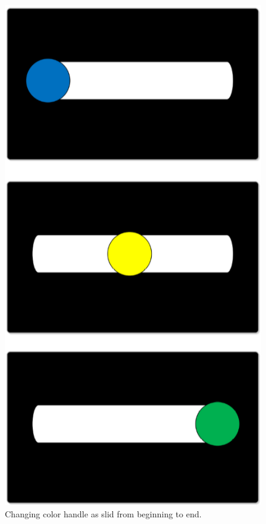 \documentclass{sigchi}
\begin{document}
        \begin{figure}[b]
            \centering
            \includegraphics[height=\textheight/2]{figures/handle_change.png}
            \caption{Changing color handle as slid from beginning to end.}
            \label{fig:mockup3}
        \end{figure}
\end{document}
